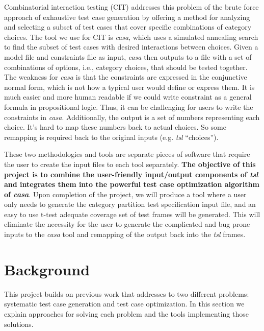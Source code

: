 \documentclass[a4full,12pt]{article}
\begin{document}
Combinatorial interaction testing (CIT) addresses this problem of the brute force approach of exhaustive test case generation 
by offering a method for analyzing and selecting a subset of test cases
  that cover specific combinations of category choices. The tool we use for CIT is \emph{casa},
  which uses a simulated annealing search to find the subset of test cases with desired interactions between choices. Given a model file and
  constraints file as input, \emph{casa} then outputs to a file with a set of combinations of options, i.e., category choices, that should
  be tested together. The weakness for \emph{casa} is that the constraints are expressed in the conjunctive
  normal form, which is not how a typical user would define or express them. It is much easier and more human
  readable if we could write constraint as a general formula in propositional logic. Thus, it can be challenging for users to write the constraints in \emph{casa}.  Additionally, the output is a set of numbers representing each choice. It's hard to map these numbers back
  to actual choices. So some remapping is required back to the original inputs (e.g. \emph{tsl} ``choices'').
 
These two methodologies and tools are separate pieces of software that require the user to create the input files
  to each tool separately.  {\bf The objective of this project is to combine the user-friendly input/output components
  of \emph{tsl} and integrates them into the powerful test case optimization algorithm of \emph{casa}}. Upon completion of
  the project, we will produce a tool where a user only needs to generate the category partition test specification input file, and an
  easy to use t-test adequate coverage set of test frames will be generated. This will eliminate the necessity for the
  user to generate the complicated and bug prone inputs to the \emph{casa} tool and remapping of the output back into the \emph{tsl} frames.
  
\section{Background}
This project builds on previous work that addresses to
  two different problems: systematic test case generation and test case optimization. In this section we explain approaches for solving each problem and the tools implementing those solutions.
\end{document}
